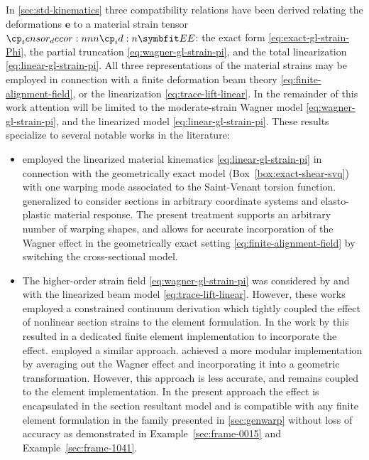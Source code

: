 In \cref{sec:std-kinematics} three compatibility relations have been derived relating the deformations \(\bm{e}\) to a material strain tensor \(\StrainTensor\): the exact form \eqref{eq:exact-gl-strain-Phi}, the partial truncation \eqref{eq:wagner-gl-strain-pi}, and the total linearization \eqref{eq:linear-gl-strain-pi}. 
All three representations of the material strains may be employed in connection with a finite deformation beam theory \eqref{eq:finite-alignment-field}, or the linearization \eqref{eq:trace-lift-linear}. 
In the remainder of this work attention will be limited to the moderate-strain Wagner model \eqref{eq:wagner-gl-strain-pi}, and the linearized model \eqref{eq:linear-gl-strain-pi}.
These results specialize to several notable works in the literature:
\begin{itemize}
    \item \cite{simo1991geometricallyexact} employed the linearized material kinematics \eqref{eq:linear-gl-strain-pi} in connection with the geometrically exact model (Box~\ref{box:exact-shear-svq}) with one warping mode associated to the Saint-Venant torsion function. \cite{gruttmann2000theory} generalized \cite{simo1991geometricallyexact} to consider sections in arbitrary coordinate systems and elasto-plastic material response. 
    The present treatment supports an arbitrary number of warping shapes, and allows for accurate incorporation of the Wagner effect in the geometrically exact setting \eqref{eq:finite-alignment-field} by switching the cross-sectional model. 
    \item The higher-order strain field \eqref{eq:wagner-gl-strain-pi} was considered by \cite{battini2002corotational-thesis} and \cite{lecorvec2012nonlinear} with the linearized beam model \eqref{eq:trace-lift-linear}. 
    However, these works employed a constrained continuum derivation which tightly coupled the effect of nonlinear section strains to the element formulation. In the work by \cite{battini2002corotational-thesis} this resulted in a dedicated finite element implementation to incorporate the effect. \cite{du2020threedimensional} employed a similar approach. 
    \cite{lecorvec2012nonlinear} achieved a more modular implementation by averaging out the Wagner effect and incorporating it into a geometric transformation. However, this approach is less accurate, and remains coupled to the element implementation.
    In the present approach the effect is encapsulated in the section resultant model and is compatible with any finite element formulation in the family presented in \cref{sec:genwarp} without loss of accuracy as demonstrated in Example~\ref{sec:frame-0015} and Example~\ref{sec:frame-1041}.
\end{itemize}

